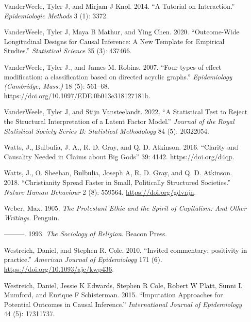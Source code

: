 \documentclass[
  singlecolumn]{article}
\newlength{\cslhangindent}
\newlength{\cslentryspacingunit} %
\newenvironment{CSLReferences}[2] %
 {%
  \setlength{\parindent}{0pt}
  \ifodd #1
  \let\oldpar\par
  \def\par{\hangindent=\cslhangindent\oldpar}
  \fi
  \setlength{\parskip}{#2\cslentryspacingunit}
 }%
 {}
\begin{document}
\begin{CSLReferences}{1}{0}
\leavevmode{}%
VanderWeele, Tyler J, and Mirjam J Knol. 2014. {``A Tutorial on
Interaction.''} \emph{Epidemiologic Methods} 3 (1): 3372.

\leavevmode{}%
VanderWeele, Tyler J, Maya B Mathur, and Ying Chen. 2020.
{``Outcome-Wide Longitudinal Designs for Causal Inference: A New
Template for Empirical Studies.''} \emph{Statistical Science} 35 (3):
437466.

\leavevmode{}%
VanderWeele, Tyler J., and James M. Robins. 2007. {``Four types of
effect modification: a classification based on directed acyclic
graphs.''} \emph{Epidemiology (Cambridge, Mass.)} 18 (5): 561--68.
\url{https://doi.org/10.1097/EDE.0b013e318127181b}.

\leavevmode{}%
VanderWeele, Tyler J, and Stijn Vansteelandt. 2022. {``A Statistical
Test to Reject the Structural Interpretation of a Latent Factor
Model.''} \emph{Journal of the Royal Statistical Society Series B:
Statistical Methodology} 84 (5): 20322054.

\leavevmode{}%
Watts, J., Bulbulia, J. A., R. D. Gray, and Q. D. Atkinson. 2016.
{``Clarity and Causality Needed in Claims about Big Gods''} 39: 4142.
\url{https://doi.org/d4qp}.

\leavevmode{}%
Watts, J., O. Sheehan, Bulbulia, Joseph A, R. D. Gray, and Q. D.
Atkinson. 2018. {``Christianity Spread Faster in Small, Politically
Structured Societies.''} \emph{Nature Human Behaviour} 2 (8): 559564.
\url{https://doi.org/gdvnjn}.

\leavevmode{}%
Weber, Max. 1905. \emph{The Protestant Ethic and the Spirit of
Capitalism: And Other Writings}. Penguin.

\leavevmode{}%
---------. 1993. \emph{The Sociology of Religion}. Beacon Press.

\leavevmode{}%
Westreich, Daniel, and Stephen R. Cole. 2010. {``Invited commentary:
positivity in practice.''} \emph{American Journal of Epidemiology} 171
(6). \url{https://doi.org/10.1093/aje/kwp436}.

\leavevmode{}%
Westreich, Daniel, Jessie K Edwards, Stephen R Cole, Robert W Platt,
Sunni L Mumford, and Enrique F Schisterman. 2015. {``Imputation
Approaches for Potential Outcomes in Causal Inference.''}
\emph{International Journal of Epidemiology} 44 (5): 17311737.


\end{CSLReferences}
\end{document}
